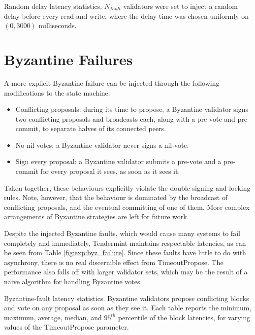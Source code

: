 \begin{table}[]
	
	\caption[Latency statistics under randomized delays]{Random delay latency statistics. $N_{fault}$ validators were set to inject a random delay
before every read and write, where the delay time was chosen uniformly on $(0, 3000)$ milliseconds.}
	\label{fig:exp:delay}
\end{table}


\section{Byzantine Failures}

A more explicit Byzantine failure can be injected through the following modifications
to the state machine:

\begin{itemize}
\item{Conflicting proposals: during its time to propose, a Byzantine validator signs two conflicting proposals and broadcasts each, along with a pre-vote and pre-commit, to separate halves of its connected peers.} 
\item{No nil votes: a Byzantine validator never signs a nil-vote.}
\item{Sign every proposal: a Byzantine validator submits a pre-vote and a pre-commit for every proposal it sees, as soon as it sees it.}
\end{itemize}

Taken together, these behaviours explicitly violate the double signing and locking rules. 
Note, however, that the behaviour is dominated by the broadcast of conflicting proposals,
and the eventual committing of one of them.
More complex arrangements of Byzantine strategies are left for future work.
 
Despite the injected Byzantine faults, 
which would cause many systems to fail completely and immediately,
Tendermint maintains respectable latencies, as can be seen from Table \ref{fig:exp:byz_failure}.
Since these faults have little to do with asynchrony,
there is no real discernible effect from TimeoutPropose.
The performance also falls off with larger validator sets,
which may be the result of a naive algorithm for handling Byzantine votes.

\begin{table}[]
	
	\caption[Latency statistics under Byzantine faults]{Byzantine-fault latency statistics.
Byzantine validators propose conflicting blocks and vote on any proposal as soon as they see it.
Each table reports the minimum, maximum, average, median, and $95^{th}$ percentile of the block latencies, for varying values of the TimeoutPropose parameter.}
	\label{fig:exp:byz_failure}
\end{table}

